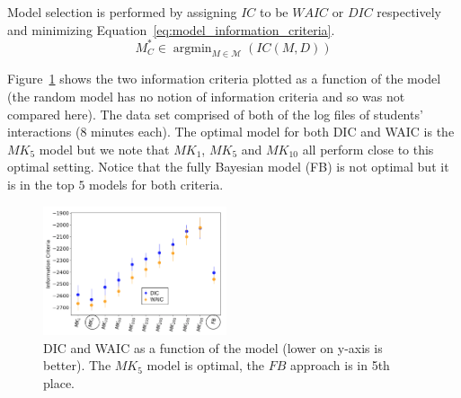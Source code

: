 \documentclass[letterpaper]{article} %
\DeclareMathOperator{\argmin}{argmin}
\begin{document}
Model selection is performed by assigning $IC$ to be $WAIC$ or $DIC$ respectively and minimizing Equation~\ref{eq:model_information_criteria}. 
\begin{equation}
    \label{eq:model_information_criteria}
    M^*_C \in \argmin_{M \in \mathcal{M}}(IC(M, D))
\end{equation}

Figure~\ref{fig:dic_waic_scores} shows the two information criteria plotted as a function of the model (the random model has no notion of information criteria and so was not compared here). The data set comprised of both of the log files of students' interactions (8 minutes each). The optimal model for both DIC and WAIC is the $MK_{5}$ model but we note that $MK_{1}$, $MK_{5}$ and $MK_{10}$ all perform close to this optimal setting. Notice that the fully Bayesian model (FB) is not optimal but it is in the top $5$ models for both criteria. 
\begin{figure}[t]
\centering
\includegraphics[width=0.48\textwidth]{images/dic_waic_scores.png}
\caption{DIC and WAIC as a function of the model (lower on y-axis is better). The $MK_5$ model is optimal, the $FB$ approach is in 5th place.}
\label{fig:dic_waic_scores}
\end{figure}
\end{document}
